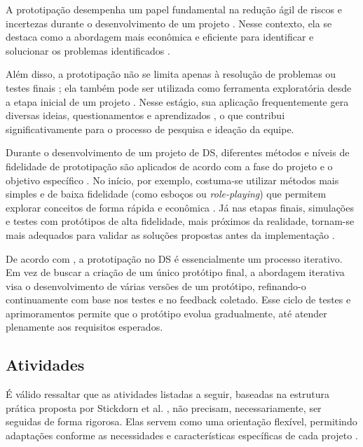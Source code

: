 A prototipação desempenha um papel fundamental na redução ágil de riscos e incertezas durante o desenvolvimento de um projeto \cite{mager2023product}. Nesse contexto, ela se destaca como a abordagem mais econômica e eficiente para identificar e solucionar os problemas identificados \cite{soto2023prototyping}.

Além disso, a prototipação não se limita apenas à resolução de problemas ou testes finais \cite{paust2025integrative}; ela também pode ser utilizada como ferramenta exploratória desde a etapa inicial de um projeto \cite{soto2023prototyping, lee2022how}. Nesse estágio, sua aplicação frequentemente gera diversas ideias, questionamentos e aprendizados \cite{paust2025integrative}, o que contribui significativamente para o processo de pesquisa e ideação da equipe.

Durante o desenvolvimento de um projeto de DS, diferentes métodos e níveis de fidelidade de prototipação são aplicados de acordo com a fase do projeto e o objetivo específico \cite{mager2023product, paust2025integrative, wang2023smartproducts}. No início, por exemplo, costuma-se utilizar métodos mais simples e de baixa fidelidade (como esboços ou \textit{role-playing}) que permitem explorar conceitos de forma rápida e econômica \cite{asbjornsen2022echange, kumar2023rheumatology, seko2024transitions}. Já nas etapas finais, simulações e testes com protótipos de alta fidelidade, mais próximos da realidade, tornam-se mais adequados para validar as soluções propostas antes da implementação \cite{asbjornsen2022echange, villa2022integratedcare, seko2024transitions, yan2022pssvalue}.

De acordo com \cite{Christie2012}, a prototipação no DS é essencialmente um processo iterativo. Em vez de buscar a criação de um único protótipo final, a abordagem iterativa visa o desenvolvimento de várias versões de um protótipo, refinando-o continuamente com base nos testes e no feedback coletado. Esse ciclo de testes e aprimoramentos permite que o protótipo evolua gradualmente, até atender plenamente aos requisitos esperados.

\subsection{Atividades}

É válido ressaltar que as atividades listadas a seguir, baseadas na estrutura prática proposta por Stickdorn et al. \cite{Stickdorn2019}, não precisam, necessariamente, ser seguidas de forma rigorosa. Elas servem como uma orientação flexível, permitindo adaptações conforme as necessidades e características específicas de cada projeto \cite{soto2023prototyping}.

